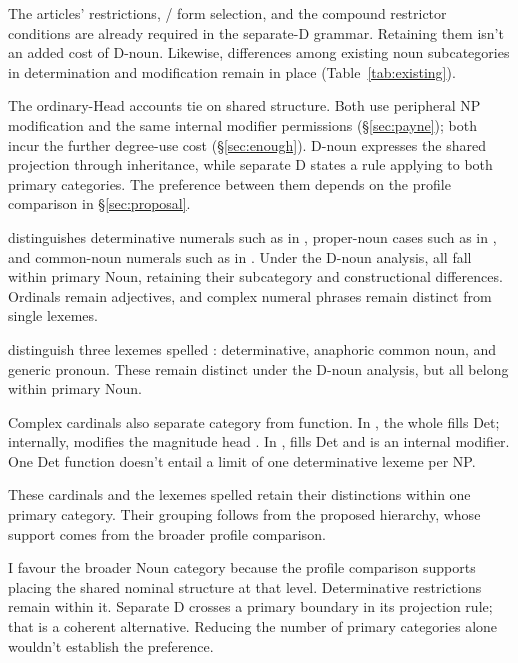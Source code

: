 \documentclass[12pt]{article}
\begin{document}
The articles' restrictions, / form selection, and the compound restrictor conditions are already required in the separate-D grammar. Retaining them isn't an added cost of D-noun. Likewise, differences among existing noun subcategories in determination and modification remain in place (Table~\ref{tab:existing}).

The ordinary-Head accounts tie on shared structure. Both use peripheral NP modification and the same internal modifier permissions (§\ref{sec:payne}); both incur the further degree-use cost (§\ref{sec:enough}). D-noun expresses the shared projection through inheritance, while separate D states a rule applying to both primary categories. The preference between them depends on the profile comparison in §\ref{sec:proposal}.

\textcite{reynolds2026numerals} distinguishes determinative numerals such as  in , proper-noun cases such as  in , and common-noun numerals such as  in . Under the D-noun analysis, all fall within primary Noun, retaining their subcategory and constructional differences. Ordinals remain adjectives, and complex numeral phrases remain distinct from single lexemes.

\textcite[797--798]{payne2013anaphoric} distinguish three lexemes spelled : determinative, anaphoric common noun, and generic pronoun. These remain distinct under the D-noun analysis, but all belong within primary Noun.

Complex cardinals also separate category from function. In , the whole  fills Det; internally,  modifies the magnitude head  \citep[§4]{reynolds2026numerals}. In ,  fills Det and  is an internal modifier. One Det function doesn't entail a limit of one determinative lexeme per NP.

These cardinals and the lexemes spelled  retain their distinctions within one primary category. Their grouping follows from the proposed hierarchy, whose support comes from the broader profile comparison.

I favour the broader Noun category because the profile comparison supports placing the shared nominal structure at that level. Determinative restrictions remain within it. Separate D crosses a primary boundary in its projection rule; that is a coherent alternative. Reducing the number of primary categories alone wouldn't establish the preference.
\end{document}
